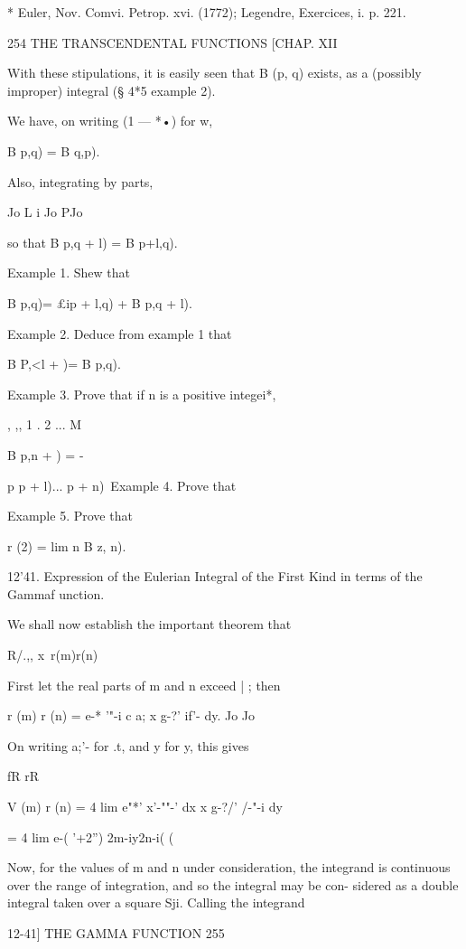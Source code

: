 * Euler, Nov. Comvi. Petrop. xvi. (1772); Legendre, Exercices, i. p.
221.



254 THE TRANSCENDENTAL FUNCTIONS [CHAP. XII

With these stipulations, it is easily seen that B (p, q) exists, as a
(possibly improper) integral (§ 4*5 example 2).

We have, on writing (1 — *•) for w,

B p,q) = B q,p).

Also, integrating by parts,

Jo L i Jo PJo

so that B p,q + l) = B p+l,q).

Example 1. Shew that

B p,q)= £ip + l,q) + B p,q + l).

Example 2. Deduce from example 1 that

B P,<l + )= B p,q).

Example 3. Prove that if n is a positive integei*,

 , ,, 1 . 2 ... M

B p,n + ) = -



p p + l)... p + n)\ Example 4. Prove that

Example 5. Prove that

r (2) = lim n B z, n).

12'41. Expression of the Eulerian Integral of the First Kind in terms
of the Gammaf unction.

We shall now establish the important theorem that

R/.,, x\ r(m)r(n)

First let the real parts of m and n exceed | ; then

r (m) r (n) = e-* '"-i c a; x g-?' if'- dy. Jo Jo

On writing a;'- for .t, and y for y, this gives

fR rR

V (m) r (n) = 4 lim e"*' x'-""-' dx x g-?/' /-"-i dy

= 4 lim e-( '+2'') 2m-iy2n-i( ( \

Now, for the values of m and n under consideration, the integrand is
continuous over the range of integration, and so the integral may be
con- sidered as a double integral taken over a square Sji. Calling the
integrand



12-41] THE GAMMA FUNCTION 255

